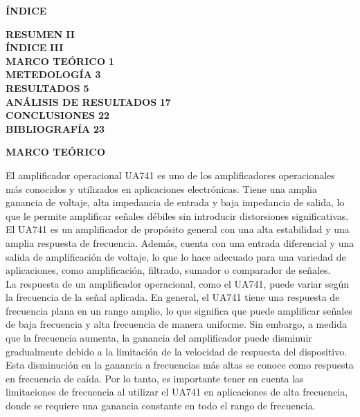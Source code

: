\documentclass[12pt]{article}
\begin{document}
	\begin{center}
		\textbf{\large ÍNDICE}\\
	\end{center}
	
	\noindent \textbf{RESUMEN} \hfill \textbf{II}\\
	\noindent \textbf{ÍNDICE} \hfill \textbf{III}\\
	\noindent \textbf{MARCO TEÓRICO} \hfill \textbf{1}\\
	\noindent \textbf{METEDOLOGÍA} \hfill \textbf{3}\\
	\noindent \textbf{RESULTADOS} \hfill \textbf{5}\\
	\noindent \textbf{ANÁLISIS DE RESULTADOS} \hfill \textbf{17}\\
	\noindent \textbf{CONCLUSIONES} \hfill \textbf{22}\\
	\noindent \textbf{BIBLIOGRAFÍA} \hfill \textbf{23}\\
	
	\newpage
	
	
	\begin{center}
		\textbf{\large MARCO TEÓRICO}\\
	\end{center}
	
	El amplificador operacional UA741 es uno de los amplificadores operacionales más conocidos y utilizados en aplicaciones electrónicas. Tiene una amplia ganancia de voltaje, alta impedancia de entrada y baja impedancia de salida, lo que le permite amplificar señales débiles sin introducir distorsiones significativas. El UA741 es un amplificador de propósito general con una alta estabilidad y una amplia respuesta de frecuencia. Además, cuenta con una entrada diferencial y una salida de amplificación de voltaje, lo que lo hace adecuado para una variedad de aplicaciones, como amplificación, filtrado, sumador o comparador de señales.\\
	
	La respuesta de un amplificador operacional, como el UA741, puede variar según la frecuencia de la señal aplicada. En general, el UA741 tiene una respuesta de frecuencia plana en un rango amplio, lo que significa que puede amplificar señales de baja frecuencia y alta frecuencia de manera uniforme. Sin embargo, a medida que la frecuencia aumenta, la ganancia del amplificador puede disminuir gradualmente debido a la limitación de la velocidad de respuesta del dispositivo. Esta disminución en la ganancia a frecuencias más altas se conoce como respuesta en frecuencia de caída. Por lo tanto, es importante tener en cuenta las limitaciones de frecuencia al utilizar el UA741 en aplicaciones de alta frecuencia, donde se requiere una ganancia constante en todo el rango de frecuencia.\\
	
\end{document}
